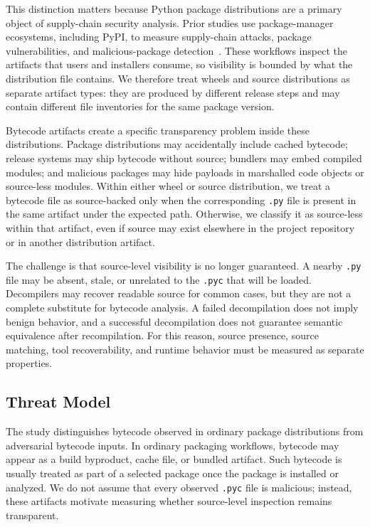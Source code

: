 This distinction matters because Python package distributions are a primary object of supply-chain security analysis.  Prior studies use package-manager ecosystems, including PyPI, to measure supply-chain attacks, package vulnerabilities, and malicious-package detection~\cite{duan2021measuring,alfadel2023empirical,gao2025malguard}.  These workflows inspect the artifacts that users and installers consume, so visibility is bounded by what the distribution file contains.  We therefore treat wheels and source distributions as separate artifact types: they are produced by different release steps and may contain different file inventories for the same package version.

Bytecode artifacts create a specific transparency problem inside these distributions.  Package distributions may accidentally include cached bytecode; release systems may ship bytecode without source; bundlers may embed compiled modules; and malicious packages may hide payloads in marshalled code objects or source-less modules.  Within either wheel or source distribution, we treat a bytecode file as source-backed only when the corresponding \texttt{.py} file is present in the same artifact under the expected path.  Otherwise, we classify it as source-less within that artifact, even if source may exist elsewhere in the project repository or in another distribution artifact.

The challenge is that source-level visibility is no longer guaranteed.  A nearby \texttt{.py} file may be absent, stale, or unrelated to the \texttt{.pyc} that will be loaded.  Decompilers may recover readable source for common cases, but they are not a complete substitute for bytecode analysis.  A failed decompilation does not imply benign behavior, and a successful decompilation does not guarantee semantic equivalence after recompilation.  For this reason, source presence, source matching, tool recoverability, and runtime behavior must be measured as separate properties.

\subsection{Threat Model}\label{sec:threat}

The study distinguishes bytecode observed in ordinary package distributions from adversarial bytecode inputs.  In ordinary packaging workflows, bytecode may appear as a build byproduct, cache file, or bundled artifact.  Such bytecode is usually treated as part of a selected package once the package is installed or analyzed.  We do not assume that every observed \texttt{.pyc} file is malicious; instead, these artifacts motivate measuring whether source-level inspection remains transparent.

